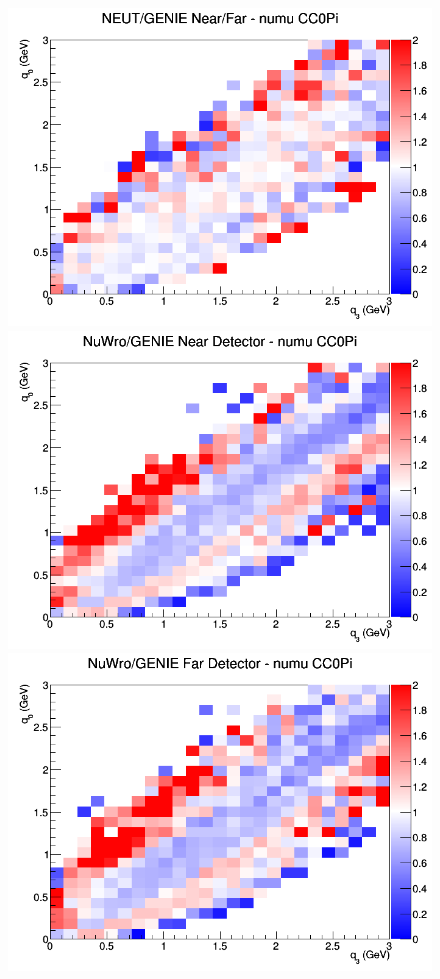 \begin{figure}[h]
\endminipage
{}
\includegraphics[width=\linewidth]{eff_q0_q3/GAr/ratios/CC0Pi_NEUT_GENIE_numu_NF_q3_q0.png}
\endminipage
\newline
{}
\includegraphics[width=\linewidth]{eff_q0_q3/GAr/ratios/CC0Pi_NuWro_GENIE_numu_near_q3_q0.png}
\endminipage
{}
\includegraphics[width=\linewidth]{eff_q0_q3/GAr/ratios/CC0Pi_NuWro_GENIE_numu_far_q3_q0.png}

\end{figure}
